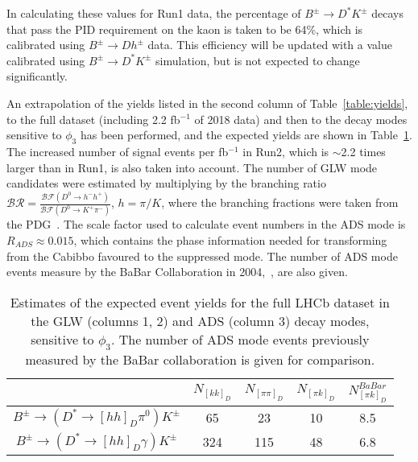 \documentclass[oneside,12pt]{article}
\begin{document}
In calculating these values for Run1 data, the percentage of $B^{\pm}\rightarrow
D^*K^{\pm}$ decays that pass the PID requirement on the kaon is taken to be
64\%, which is calibrated using $B^{\pm}\rightarrow Dh^{\pm}$ data.  This
efficiency will be updated with a value calibrated using $B^{\pm}\rightarrow
D^*K^{\pm}$ simulation, but is not expected to change significantly.

An extrapolation of the yields listed in the second column of
Table~\ref{table:yields}, to the full dataset (including 2.2 fb$^{-1}$ of 2018
data) and then to the decay modes sensitive to $\phi_3$ has been performed, and
the expected yields are shown in Table~\ref{table:extrapolatedYields}. The
increased number of signal events per fb$^{-1}$ in Run2, which is $\sim$2.2
times larger than in Run1, is also taken into account. The number of GLW mode
candidates were estimated by multiplying by the branching ratio $\mathcal{BR} =
\frac{\mathcal{BF}(D^0 \rightarrow h^- h^+)}{\mathcal{BF}(D^0 \rightarrow K^+
\pi^-)}$, $h=\pi/K$, where the branching fractions were taken from the
PDG~\cite{PDG2018}. The scale factor used to calculate event numbers in the ADS
mode is $R_{ADS}\approx 0.015$, which contains the phase information needed for
transforming from the Cabibbo favoured to the suppressed mode.  The number of
ADS mode events measure by the BaBar Collaboration in 2004,~\cite{BaBarADS}, are
also given.

\begin{table}[H]
  \centering
  \begin{tabular}{| c | c | c | c | c |}
    \hline
    & $N_{[kk]_{D}}$ & $N_{[\pi\pi]_{D}}$ & $N_{[\pi k]_D}$ & $N_{[\pi k]_D}^{BaBar}$ \\ \hline
    $B^{\pm}\rightarrow(D^*\rightarrow [hh]_D\pi^0)K^{\pm}$ & 65 & 23  & 10 & 8.5 \\ \hline
    $B^{\pm}\rightarrow(D^*\rightarrow [hh]_D\gamma)K^{\pm}$ & 324 & 115 & 48 & 6.8 \\ \hline
  \end{tabular}
  \caption{{Estimates of the expected event yields for the full LHCb
      dataset in the GLW (columns 1, 2) and ADS (column 3) decay modes, sensitive to
      $\phi_3$. The number of ADS mode events previously measured by the BaBar
  collaboration is given for comparison.}} \label{table:extrapolatedYields}
\end{table}

\end{document}
